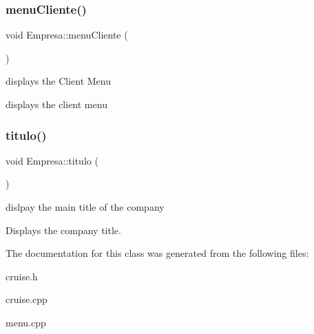 \subsubsection{\texorpdfstring{menu\+Cliente()}{menuCliente()}}
{\footnotesize\ttfamily void Empresa\+::menu\+Cliente (\begin{DoxyParamCaption}{ }\end{DoxyParamCaption})}



displays the Client Menu 

displays the client menu \mbox{\label{classEmpresa_ad79f7196a8ce7256771cbd7b9542155c}} 
\subsubsection{\texorpdfstring{titulo()}{titulo()}}
{\footnotesize\ttfamily void Empresa\+::titulo (\begin{DoxyParamCaption}{ }\end{DoxyParamCaption})}



dislpay the main title of the company 

Displays the company title. 

The documentation for this class was generated from the following files\+:\begin{DoxyCompactItemize}
\item 
cruise.\+h\item 
cruise.\+cpp\item 
menu.\+cpp\end{DoxyCompactItemize}

